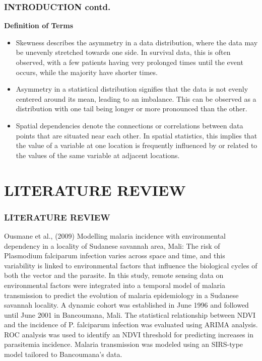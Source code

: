 \documentclass{beamer}
\begin{document}
\begin{frame}
\frametitle{INTRODUCTION contd.}
\textbf{Definition of Terms}
\begin{itemize}

    \item Skewness describes the asymmetry in a data distribution, where the data may be unevenly stretched towards one side. In survival data, this is often observed, with a few patients having very prolonged times until the event occurs, while the majority have shorter times.
    \item Asymmetry in a statistical distribution signifies that the data is not evenly centered around its mean, leading to an imbalance. This can be observed as a distribution with one tail being longer or more pronounced than the other.    
    \item Spatial dependencies denote the connections or correlations between data points that are situated near each other. In spatial statistics, this implies that the value of a variable at one location is frequently influenced by or related to the values of the same variable at adjacent locations.
   
\end{itemize}

\end{frame}


\section{LITERATURE REVIEW}

\begin{frame}
		\frametitle{\textbf{LITERATURE REVIEW}}
  \renewcommand{\arraystretch}{1.5}
Ousmane et al., (2009) Modelling malaria incidence with environmental dependency in a
locality of Sudanese savannah area, Mali: The risk of Plasmodium falciparum infection varies across space and time, and this variability is linked to environmental factors that influence the biological cycles of both the vector and the parasite.  In this study, remote sensing data on environmental factors were integrated into a temporal model of malaria transmission to predict the evolution of malaria epidemiology in a Sudanese savannah locality. A dynamic cohort was established in June 1996 and followed until June 2001 in Bancoumana, Mali. The statistical relationship between NDVI and the incidence of P. falciparum infection was evaluated using ARIMA analysis. ROC analysis was used to identify an NDVI threshold for predicting increases in parasitemia incidence. Malaria transmission was modeled using an SIRS-type model tailored to Bancoumana's data. 

	\end{frame}
	
\end{document}
